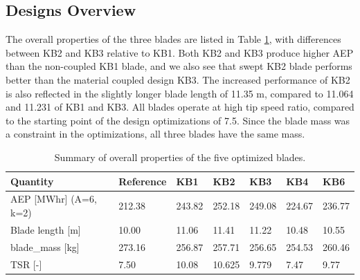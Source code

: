 \subsection{Designs Overview}

The overall properties of the three blades are listed in Table \ref{tab:overall_summary}, with differences between KB2 and KB3 relative to KB1.
Both KB2 and KB3 produce higher AEP than the non-coupled KB1 blade, and we also see that swept KB2 blade performs better than the material coupled design KB3.
The increased performance of KB2 is also reflected in the slightly longer blade length of 11.35 m, compared to 11.064 and 11.231 of KB1 and KB3.
All blades operate at high tip speed ratio, compared to the starting point of the design optimizations of 7.5.
Since the blade mass was a constraint in the optimizations, all three blades have the same mass.

\begin{table}
\begin{tabular}{l|l|l|l|l|l|l}
\hline
 Quantity              & Reference & KB1 & KB2     & KB3     & KB4    & KB6          \\
\hline
 AEP [MWhr] (A=6, k=2) & 212.38 & 243.82 & 252.18  & 249.08  & 224.67 & 236.77  \\
 Blade length [m]      & 10.00  & 11.06  & 11.41   & 11.22   & 10.48  & 10.55  \\
 blade\_mass [kg]      & 273.16 & 256.87 & 257.71  & 256.65  & 254.53 & 260.46 \\
 TSR [-]               & 7.50   & 10.08  & 10.625  &  9.779  & 7.47   & 9.77 \\
\hline
\hline
\end{tabular}
\caption{Summary of overall properties of the five optimized blades.}
\label{tab:overall_summary}
\end{table}


